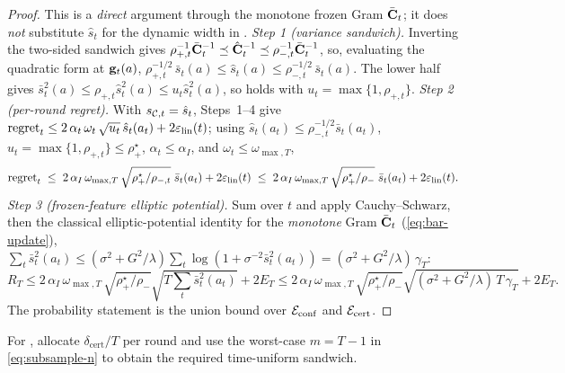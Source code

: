 \begin{proof}
This is a \emph{direct} argument through the monotone frozen Gram $\bar{\mathbf{C}}_t$; it
does \emph{not} substitute $\hat s_t$ for the dynamic width in
.
\emph{Step 1 (variance sandwich).}  Inverting the two-sided sandwich gives
$\rho_{+,t}^{-1}\bar{\mathbf{C}}_t^{-1}\preceq\hat{\mathbf{C}}_t^{-1}\preceq\rho_{-,t}^{-1}\bar{\mathbf{C}}_t^{-1}$,
so, evaluating the quadratic form at $\mathbf{g}_t(a)$,
$\rho_{+,t}^{-1/2}\,\bar s_t(a)\le\hat s_t(a)\le\rho_{-,t}^{-1/2}\,\bar s_t(a)$.
The lower half gives $\bar s_t^2(a)\le\rho_{+,t}\hat s_t^2(a)\le u_t\hat s_t^2(a)$,
so  holds with $u_t=\max\{1,\rho_{+,t}\}$.
\emph{Step 2 (per-round regret).}  With $s_{\mathcal{C},t}=\hat s_t$,
 Steps~1--4 give
$\mathrm{regret}_t\le
2\,\alpha_t\,\omega_t\,\sqrt{u_t}\,\hat s_t(a_t)+2\varepsilon_{\mathrm{lin}}(t)$; using
$\hat s_t(a_t)\le\rho_{-,t}^{-1/2}\bar s_t(a_t)$,
$u_t=\max\{1,\rho_{+,t}\}\le\rho_+^{\star}$,
$\alpha_t\le\alpha_I$, and $\omega_t\le\omega_{\max,T}$,
\[
  \mathrm{regret}_t
  \;\le\;
  2\,\alpha_I\,\omega_{\max,T}\,\sqrt{\rho_+^{\star}/\rho_{-,t}}\;\bar s_t(a_t)
  +2\varepsilon_{\mathrm{lin}}(t)
  \;\le\;
  2\,\alpha_I\,\omega_{\max,T}\,\sqrt{\rho_+^{\star}/\rho_-}\;\bar s_t(a_t)
  +2\varepsilon_{\mathrm{lin}}(t).
\]
\emph{Step 3 (frozen-feature elliptic potential).}  Sum over $t$ and apply
Cauchy--Schwarz, then the classical elliptic-potential identity for the
\emph{monotone} Gram $\bar{\mathbf{C}}_t$ (\eqref{eq:bar-update}),
$\sum_{t}\bar s_t^2(a_t)\le(\sigma^2+G^2/\lambda)\sum_t\log(1+\sigma^{-2}
\bar s_t^2(a_t))=(\sigma^2+G^2/\lambda)\,\gamma_T$:
\[
  R_T\le 2\,\alpha_I\,\omega_{\max,T}\,\sqrt{\rho_+^{\star}/\rho_-}
  \sqrt{T\sum_t\bar s_t^2(a_t)}+2E_T
  \le 2\,\alpha_I\,\omega_{\max,T}\,\sqrt{\rho_+^{\star}/\rho_-}
  \sqrt{(\sigma^2+G^2/\lambda)\,T\,\gamma_T}+2E_T.
\]
The probability statement is the union bound over $\mathcal{E}_{\mathrm{conf}}$ and
$\mathcal{E}_{\mathrm{cert}}$.
\end{proof}

\noindent
For , allocate $\delta_{\mathrm{cert}}/T$ per round and use
the worst-case $m=T{-}1$ in \eqref{eq:subsample-n} to obtain the required
time-uniform sandwich.
